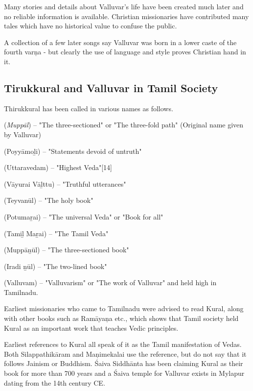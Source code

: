 Many stories and details about Valluvar’s life have been created much later and no reliable information is available. Christian missionaries have contributed many tales which have no historical value to confuse the public.

A collection of a few later songs say Valluvar was born in a lower caste of the fourth varņa - but clearly the use of language and style proves Christian hand in it.

\subsection*{Tirukkural and Valluvar in Tamil Society}

Thirukkural has been called in various names as follows.

 (\textit{Muppāl}) – "The three-sectioned" or "The three-fold path" (Original name given by Valluvar)

 (Poyyāmoḻi) – "Statements devoid of untruth"

 (Uttaravedam) – "Highest Veda"[14]

 (Vāyurai Vāḻttu) – "Truthful utterances"

 (Teyvanūl) – "The holy book"

 (Potumaṟai) – "The universal Veda" or "Book for all"

 (Tamiḻ Maṟai) – "The Tamil Veda"

 (Muppāṉūl) – "The three-sectioned book"

 (Iradi ṉūl) – "The two-lined book"

 (Valluvam) – "Valluvarism" or "The work of Valluvar" and held high in Tamilnadu.

Earliest missionaries who came to Tamilnadu were advised to read Kural, along with other books such as Ramāyaņa etc., which shows that Tamil society held Kural as an important work that teaches Vedic principles.

Earliest references to Kural all speak of it as the Tamil manifestation of Vedas. Both Silappathikāram and Maņimekalai use the reference, but do not say that it follows Jainism or Buddhism. Śaiva Siddhānta has been claiming Kural as their book for more than 700 years and a Śaiva temple for Valluvar exists in Mylapur dating from the 14th century CE.

